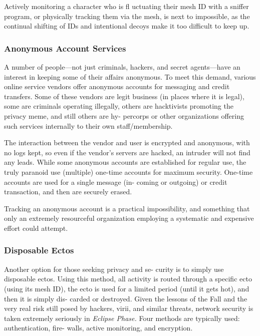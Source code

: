 Actively monitoring a character who is fl uctuating 
their mesh ID with a sniffer program, or physically 
tracking them via the mesh, is next to impossible, as 
the continual shifting of IDs and intentional decoys 
make it too difficult to keep up.

\subsubsection{Anonymous Account Services}

A number of people—not just criminals, hackers, and 
secret agents—have an interest in keeping some of 
their affairs anonymous. To meet this demand, various 
online service vendors offer anonymous accounts for 
messaging and credit transfers. Some of these vendors 
are legit business (in places where it is legal), some 
are criminals operating illegally, others are hacktivists 
promoting the privacy meme, and still others are hy-
percorps or other organizations offering such services 
internally to their own staff/membership.

The interaction between the vendor and user is 
encrypted and anonymous, with no logs kept, so even 
if the vendor's servers are hacked, an intruder will 
not find any leads. While some anonymous accounts 
are established for regular use, the truly paranoid use 
(multiple) one-time accounts for maximum security. 
One-time accounts are used for a single message (in-
coming or outgoing) or credit transaction, and then 
are securely erased.

Tracking an anonymous account is a practical 
impossibility, and something that only an extremely 
resourceful organization employing a systematic and 
expensive effort could attempt.

\subsubsection{Disposable Ectos}

Another option for those seeking privacy and se-
curity is to simply use disposable ectos. Using this 
method, all activity is routed through a specific ecto 
(using its mesh ID), the ecto is used for a limited 
period (until it gets hot), and then it is simply dis-
carded or destroyed.
Given the lessons of the Fall and the very real risk still 
posed by hackers, virii, and similar threats, network 
security is taken extremely seriously in \textit{Eclipse Phase. }
Four methods are typically used: authentication, fire-
walls, active monitoring, and encryption.

